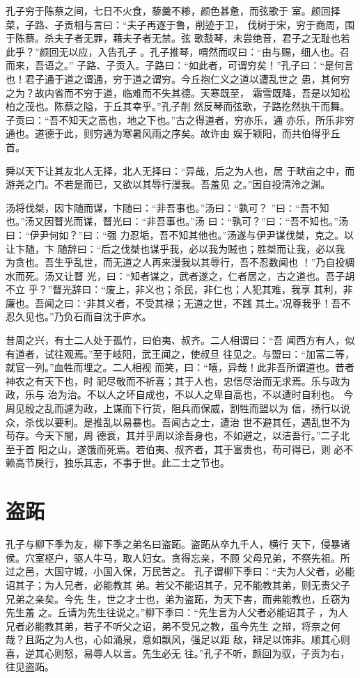 \documentclass[a4paper,12pt,UTF8,twoside]{ctexbook}
\begin{document}
孔子穷于陈蔡之间，七日不火食，藜羹不糁，颜色甚惫，而弦歌于 室。颜回择菜，子路、子贡相与言曰：“夫子再逐于鲁，削迹于卫， 伐树于宋，穷于商周，围于陈蔡。杀夫子者无罪，藉夫子者无禁。弦 歌鼓琴，未尝绝音，君子之无耻也若此乎？”颜回无以应，入告孔子 。孔子推琴，喟然而叹曰：“由与赐，细人也。召而来，吾语之。” 子路、子贡入。子路曰：“如此者，可谓穷矣！”孔子曰：“是何言 也！君子通于道之谓通，穷于道之谓穷。今丘抱仁义之道以遭乱世之 患，其何穷之为？故内省而不穷于道，临难而不失其德。天寒既至， 霜雪既降，吾是以知松柏之茂也。陈蔡之隘，于丘其幸乎。”孔子削 然反琴而弦歌，子路扢然执干而舞。 子贡曰：“吾不知天之高也，地之下也。”古之得道者，穷亦乐，通 亦乐，所乐非穷通也。道德于此，则穷通为寒暑风雨之序矣。故许由 娱于颖阳，而共伯得乎丘首。

舜以天下让其友北人无择，北人无择曰：“异哉，后之为人也，居 于畎亩之中，而游尧之门。不若是而已，又欲以其辱行漫我。吾羞见 之。”因自投清泠之渊。

汤将伐桀，因卞随而谋，卞随曰：“非吾事也。”汤曰：“孰可？ ”曰∶“吾不知也。”汤又因瞀光而谋，瞀光曰：“非吾事也。”汤 曰∶“孰可？”曰：“吾不知也。”汤曰：“伊尹何如？”曰：“强 力忍垢，吾不知其他也。”汤遂与伊尹谋伐桀，克之。以让卞随，卞 随辞曰：“后之伐桀也谋乎我，必以我为贼也；胜桀而让我，必以我 为贪也。吾生乎乱世，而无道之人再来漫我以其辱行，吾不忍数闻也 ！”乃自投椆水而死。汤又让瞀 光，曰：“知者谋之，武者遂之，仁者居之，古之道也。吾子胡不立 乎？”瞀光辞曰：“废上，非义也；杀民，非仁也；人犯其难，我享 其利，非廉也。吾闻之曰：‘非其义者，不受其禄；无道之世，不践 其土。’况尊我乎！吾不忍久见也。”乃负石而自沈于庐水。

昔周之兴，有士二人处于孤竹，曰伯夷、叔齐。二人相谓曰：“吾 闻西方有人，似有道者，试往观焉。”至于岐阳，武王闻之，使叔旦 往见之。与盟曰：“加富二等，就官一列。”血牲而埋之。二人相视 而笑，曰：“嘻，异哉！此非吾所谓道也。昔者神农之有天下也，时 祀尽敬而不祈喜；其于人也，忠信尽治而无求焉。乐与政为政，乐与 治为治。不以人之坏自成也，不以人之卑自高也，不以遭时自利也。 今周见殷之乱而遽为政，上谋而下行货，阻兵而保威，割牲而盟以为 信，扬行以说众，杀伐以要利。是推乱以易暴也。吾闻古之士，遭治 世不避其任，遇乱世不为苟存。今天下闇，周 德衰，其并乎周以涂吾身也，不如避之，以洁吾行。”二子北至于首 阳之山，遂饿而死焉。若伯夷、叔齐者，其于富贵也，苟可得已，则 必不赖高节戾行，独乐其志，不事于世。此二士之节也。
\section{盗跖}

孔子与柳下季为友，柳下季之弟名曰盗跖。盗跖从卒九千人，横行 天下，侵暴诸侯。穴室枢户，驱人牛马，取人妇女。贪得忘亲，不顾 父母兄弟，不祭先祖。所过之邑，大国守城，小国入保，万民苦之。 孔子谓柳下季曰：“夫为人父者，必能诏其子；为人兄者，必能教其 弟。若父不能诏其子，兄不能教其弟，则无贵父子兄弟之亲矣。今先 生，世之才士也，弟为盗跖，为天下害，而弗能教也，丘窃为先生羞 之。丘请为先生往说之。”柳下季曰：“先生言为人父者必能诏其子 ，为人兄者必能教其弟，若子不听父之诏，弟不受兄之教，虽今先生 之辩，将奈之何哉？且跖之为人也，心如涌泉，意如飘风，强足以距 敌，辩足以饰非。顺其心则喜，逆其心则怒，易辱人以言。先生必无 往。”孔子不听，颜回为驭，子贡为右，往见盗跖。
\end{document}
